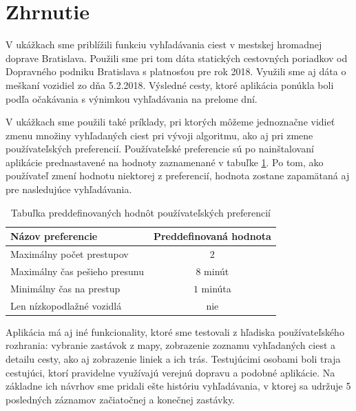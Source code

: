\section{Zhrnutie}
V ukážkach sme priblížili funkciu vyhľadávania ciest v mestskej hromadnej doprave Bratislava. Použili sme pri tom dáta statických cestovných poriadkov od Dopravného podniku Bratislava s platnosťou pre rok 2018. Využili sme aj dáta o meškaní vozidiel zo dňa 5.2.2018. Výsledné cesty, ktoré aplikácia ponúkla boli podľa očakávania s výnimkou vyhľadávania na prelome dní. 

V ukážkach sme použili také príklady, pri ktorých môžeme jednoznačne vidieť zmenu množiny vyhľadaných ciest pri vývoji algoritmu, ako aj pri zmene používateľských preferencií. Používateľské preferencie sú po nainštalovaní aplikácie prednastavené na hodnoty zaznamenané v tabuľke \ref{table:default-preferencies}. Po tom, ako používateľ zmení hodnotu niektorej z preferencií, hodnota zostane zapamätaná aj pre nasledujúce vyhľadávania. 

\begin{table}[H]
\small
\begin{center}
\begin{tabular}{|l|c|}
\hline
\rowcolor[HTML]{C0C0C0} 
\textbf{Názov preferencie} & \textbf{Preddefinovaná hodnota} \\ \hline
Maximálny počet prestupov  & $2$         \\ \hline
Maximálny čas pešieho presunu & $8$  minút  \\ \hline
Minimálny čas na prestup & $1$ minúta  \\ \hline
Len nízkopodlažné vozidlá & nie  \\ \hline
\end{tabular}
\end{center}
\caption{Tabuľka preddefinovaných hodnôt používateľských preferencií}
\label{table:default-preferencies}
\end{table}

Aplikácia má aj iné funkcionality, ktoré sme testovali z hľadiska používateľského rozhrania: vybranie zastávok z mapy, zobrazenie zoznamu vyhľadaných ciest a detailu cesty, ako aj zobrazenie liniek a ich trás. Testujúcimi osobami boli traja cestujúci, ktorí pravidelne využívajú verejnú dopravu a  podobné aplikácie. Na základne ich návrhov sme pridali ešte históriu vyhľadávania, v ktorej sa udržuje 5 posledných záznamov začiatočnej a konečnej zastávky. 


